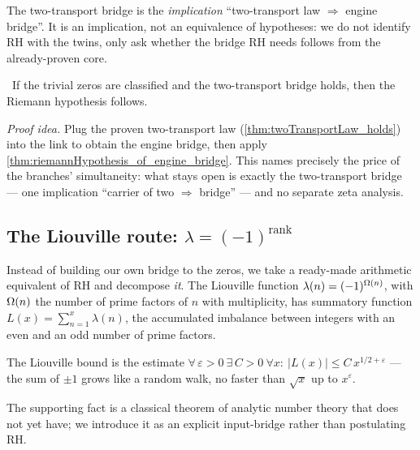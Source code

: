 \begin{definition}\label{def:TwoTransportBridge}
The two-transport bridge is the \emph{implication} ``two-transport law $\Rightarrow$ engine bridge''.
It is an implication, not an equivalence of hypotheses: we do not identify RH with the twins, only
ask whether the bridge RH needs follows from the already-proven core. 
\end{definition}

\begin{theorem}\label{thm:riemannHypothesis_of_two_transport}
\green{}\ If the trivial zeros are classified and the two-transport bridge holds, then the
 Riemann hypothesis follows. 
\end{theorem}

\emph{Proof idea.} Plug the proven two-transport law (\cref{thm:twoTransportLaw_holds}) into the
link to obtain the engine bridge, then apply \cref{thm:riemannHypothesis_of_engine_bridge}. This
names precisely the price of the branches' simultaneity: what stays open is exactly the
two-transport bridge --- one implication ``carrier of two $\Rightarrow$ bridge'' --- and no separate
zeta analysis.

\subsection{The Liouville route: $\lambda = (-1)^{\mathrm{rank}}$}

Instead of building our own bridge to the zeros, we take a ready-made arithmetic equivalent of RH
and decompose \emph{it}. The Liouville function $\lambda(n) = (-1)^{\Omega(n)}$, with $\Omega(n)$ the
number of prime factors of $n$ with multiplicity, has summatory function
$L(x) = \sum_{n=1}^{x}\lambda(n)$, the accumulated imbalance between integers with an even and an odd
number of prime factors.

\begin{definition}\label{def:LiouvilleBound}
The Liouville bound is the estimate
$\forall\,\varepsilon>0\ \exists\,C>0\ \forall x:\ |L(x)| \le C\,x^{1/2+\varepsilon}$
--- the sum of $\pm1$ grows like a random walk, no faster than $\sqrt{x}$ up to $x^{\varepsilon}$.
\end{definition}

The supporting fact is a classical theorem of analytic number theory that  does not
yet have; we introduce it as an explicit input-bridge rather than postulating RH.


